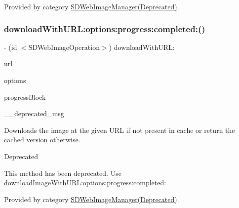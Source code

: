Provided by category \mbox{\hyperlink{category_s_d_web_image_manager_07_deprecated_08_a6ed93377fa34b44c02bce84279529dad}{S\+D\+Web\+Image\+Manager(\+Deprecated)}}.

\mbox{\label{interface_s_d_web_image_manager_a6ed93377fa34b44c02bce84279529dad}} 
\subsubsection{\texorpdfstring{download\+With\+U\+R\+L\+:options\+:progress\+:completed\+:()}{downloadWithURL:options:progress:completed:()}\hspace{0.1cm}{\footnotesize\ttfamily [2/3]}}
{\footnotesize\ttfamily -\/ (id $<$S\+D\+Web\+Image\+Operation$>$) download\+With\+U\+R\+L\+: \begin{DoxyParamCaption}\item[{(N\+S\+U\+RL $\ast$)}]{url }\item[{options:(S\+D\+Web\+Image\+Options)}]{options }\item[{progress:(S\+D\+Web\+Image\+Downloader\+Progress\+Block)}]{progress\+Block }\item[{completed:(\char`\"{}Method deprecated. Use \`{}\mbox{\hyperlink{interface_s_d_web_image_manager_ab094c361edd5ff886cbf484892e688be}{download\+Image\+With\+U\+R\+L\+:options\+:progress\+:completed\+:}}\`{}\char`\"{})}]{\+\_\+\+\_\+deprecated\+\_\+msg }\end{DoxyParamCaption}}

Downloads the image at the given U\+RL if not present in cache or return the cached version otherwise.

\begin{DoxyRefDesc}{Deprecated}
\item[\mbox{\hyperlink{deprecated__deprecated000021}{Deprecated}}]This method has been deprecated. Use {\ttfamily download\+Image\+With\+U\+R\+L\+:options\+:progress\+:completed\+:} \end{DoxyRefDesc}


Provided by category \mbox{\hyperlink{category_s_d_web_image_manager_07_deprecated_08_a6ed93377fa34b44c02bce84279529dad}{S\+D\+Web\+Image\+Manager(\+Deprecated)}}.

